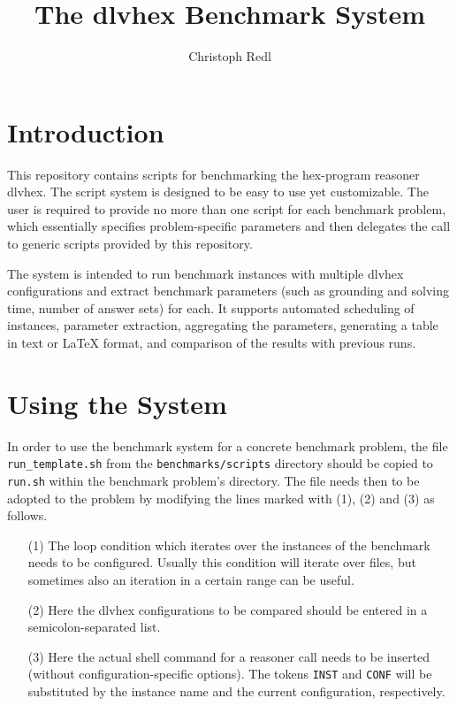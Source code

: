 \documentclass[a4paper]{article}
\newcommand{\dlvhex}{{\sc dlvhex}}
\newcommand{\hex}{{\sc hex}}
\begin{document}
	
	\title{The \dlvhex{} Benchmark System}
	\author{Christoph Redl}
	\maketitle
	
	\section{Introduction}
	\label{sec:introduction}
		
		This repository contains scripts for benchmarking the \hex-program reasoner \dlvhex.
		The script system is designed to be easy to use yet customizable.
		The user is required to provide no more than one script for each benchmark problem,
		which essentially specifies problem-specific parameters and then delegates the call
		to generic scripts provided by this repository.
		
		The system
		is intended to run benchmark instances with multiple \dlvhex{} configurations
		and extract benchmark parameters (such as grounding and solving time, number of answer sets) for each.
		It supports automated scheduling of instances, parameter extraction,
		aggregating the parameters,
		generating a table in text or \LaTeX{} format,
		and comparison of the results with previous runs.
			
	\section{Using the System}
	\label{sec:usage}
			
		In order to use the benchmark system for a concrete benchmark problem,
		the file {\tt run\_template.sh} from the {\tt benchmarks/scripts} directory
		should be copied to {\tt run.sh} within the benchmark problem's directory.
		The file needs then to be adopted to the problem by modifying the lines
		marked with (1), (2) and (3) as follows.
		\begin{enumerate}
		\item[(1)] The loop condition which iterates over the instances of the benchmark needs to be configured.
			Usually this condition will iterate over files, but sometimes also an iteration in a certain range can be useful.
		\item[(2)] Here the \dlvhex{} configurations to be compared should be entered in a semicolon-separated list.
		\item[(3)] Here the actual shell command for a reasoner call needs to be inserted (without configuration-specific options).
			The tokens {\tt INST} and {\tt CONF} will be substituted by the instance name and the current configuration, respectively.
		\end{enumerate}
		
\end{document}
